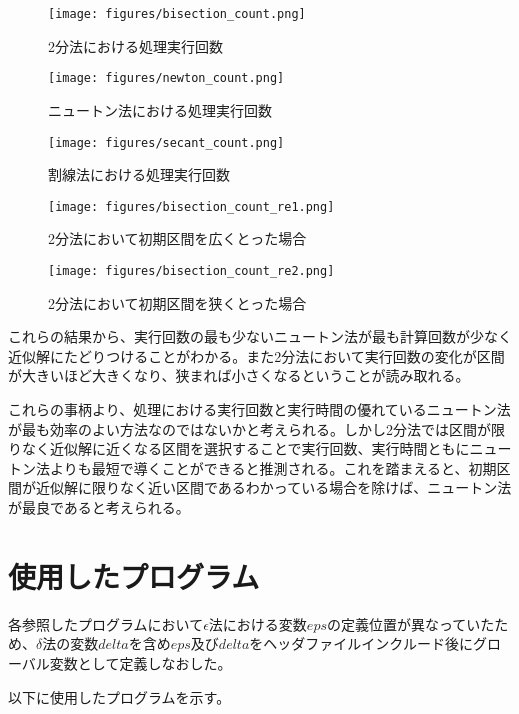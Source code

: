 \documentclass[uplatex]{jsarticle}
\begin{document}
\begin{figure}[ht]
  \centering
   \texttt{[image: figures/bisection\_count.png]}
   \caption{2分法における処理実行回数}
   \label{fig:bisection_count}
\end{figure}

\newpage

\begin{figure}[ht]
  \centering
   \texttt{[image: figures/newton\_count.png]}
   \caption{ニュートン法における処理実行回数}
   \label{fig:newton_count}
\end{figure}

\begin{figure}[ht]
  \centering
   \texttt{[image: figures/secant\_count.png]}
   \caption{割線法における処理実行回数}
   \label{fig:secant_count}
\end{figure}

\begin{figure}[ht]
  \centering
   \texttt{[image: figures/bisection\_count\_re1.png]}
   \caption{2分法において初期区間を広くとった場合}
   \label{fig:bisection_count_re1}
\end{figure}

\clearpage

\begin{figure}[ht]
  \centering
   \texttt{[image: figures/bisection\_count\_re2.png]}
   \caption{2分法において初期区間を狭くとった場合}
   \label{fig:bisection_count_re2}
\end{figure}

これらの結果から、実行回数の最も少ないニュートン法が最も計算回数が少なく近似解にたどりつけることがわかる。また2分法において実行回数の変化が区間が大きいほど大きくなり、狭まれば小さくなるということが読み取れる。

これらの事柄より、処理における実行回数と実行時間の優れているニュートン法が最も効率のよい方法なのではないかと考えられる。しかし2分法では区間が限りなく近似解に近くなる区間を選択することで実行回数、実行時間ともにニュートン法よりも最短で導くことができると推測される。これを踏まえると、初期区間が近似解に限りなく近い区間であるわかっている場合を除けば、ニュートン法が最良であると考えられる。
\clearpage
\section{使用したプログラム}
各参照したプログラムにおいて$\epsilon$法における変数$eps$の定義位置が異なっていたため、$\delta$法の変数$delta$を含め$eps$及び$delta$をヘッダファイルインクルード後にグローバル変数として定義しなおした。

以下に使用したプログラムを示す。


\clearpage


\clearpage


\clearpage
\end{document}
